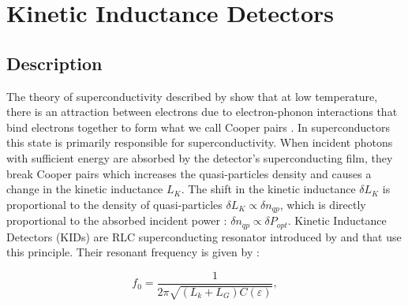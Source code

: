 
\section{Kinetic Inductance Detectors}
\label{se:kids}


%


\subsection{Description}

The theory of superconductivity described by \citep{PhysRev.108.1175} show that at low temperature, there is an attraction between electrons due to electron-phonon interactions that bind electrons together to form what we call Cooper pairs \citep{PhysRev.104.1189}. In superconductors this state is primarily responsible for superconductivity. When incident photons with sufficient energy are absorbed by the detector's superconducting film, they break Cooper pairs which increases the quasi-particles density and causes a change in the kinetic inductance $L_{K}$. The shift in the kinetic inductance $\delta L_{K}$ is proportional to the density of quasi-particles $\delta L_{K} \propto \delta n_{qp}$, which is directly proportional to the absorbed incident power : $\delta n_{qp} \propto \delta P_{opt}$.
Kinetic Inductance Detectors (KIDs) are RLC superconducting resonator introduced by \citep{2003Natur.425..817D} and that use this principle. Their resonant frequency is given by : 

\begin{equation}
f_{0} = \frac{1}{2\pi \sqrt{(L_{k}+L_{G})C(\varepsilon)}}, 
\end{equation}
 
